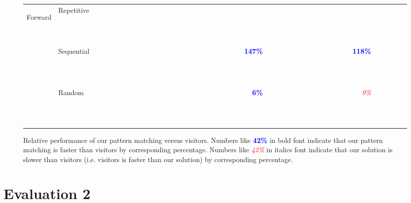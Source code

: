 \documentclass{article}
\newcommand{\f}[1]{{\scriptsize {\bf \textcolor{blue}{#1\%}}}}
\newcommand{\s}[1]{{\scriptsize {\em \textcolor{red}{#1\%}}}}
\newcommand{\n}[1]{{\scriptsize {\bf ~ ~ ~ ~ }}}
\begin{document}
\begin{figure*}
\begin{tabular}{@{}c@{ }l||@{ }r@{}@{ }r@{}@{ }r@{}|@{ }r@{}@{ }r@{}@{ }r@{}||@{ }r@{}@{ }r@{}@{ }r@{}|@{ }r@{}@{ }r@{}@{ }r@{}||@{ }r@{}@{ }r@{}@{ }r@{}|@{ }r@{}@{ }r@{}@{ }r@{}}
\hline %
\multirow{3}{*}{\begin{sideways}{\tiny Forward}\end{sideways}}
 & Repetitive &\n{   }&\n{   }&\n{   }&\n{   }&\n{   }&\n{   }&\n{   }&\n{   }&\n{   }&\n{   }&\n{   }&\n{   }&\n{   }&\n{   }&\n{   }&\n{   }&\n{   }&\n{   } \\
 & Sequential &\n{   }&\n{   }&\n{   }&\n{   }&\n{   }&\n{   }&\n{   }&\n{   }&\n{   }&\f{147}&\n{   }&\n{   }&\n{   }&\n{   }&\n{   }&\f{118}&\n{   }&\n{   } \\
 & Random     &\n{   }&\n{   }&\n{   }&\n{   }&\n{   }&\n{   }&\n{   }&\n{   }&\n{   }&\f{  6}&\n{   }&\n{   }&\n{   }&\n{   }&\n{   }&\s{  9}&\n{   }&\n{   } \\
\hline %
\end{tabular}
\caption{Relative performance of our pattern matching versus visitors. Numbers 
like \f{42} in bold font indicate that our pattern matching is faster than 
visitors by corresponding percentage. Numbers like \s{42} in italics font 
indicate that our solution is slower than visitors (i.e. visitors is faster than 
our solution) by corresponding percentage.}
\label{relperf}
\end{figure*}

\section{Evaluation 2}
\end{document}
